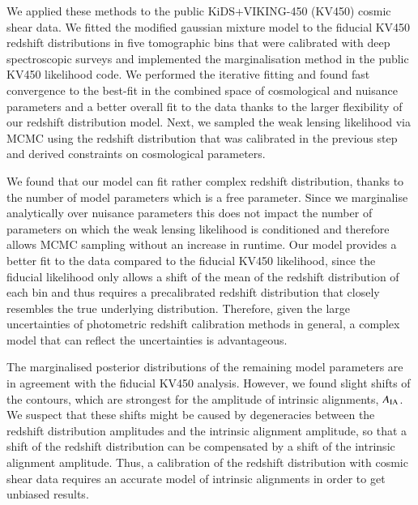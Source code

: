 \documentclass{aa}
\begin{document}
We applied these methods to the public KiDS+VIKING-450 (KV450) cosmic shear data. We fitted the modified gaussian mixture model to the fiducial KV450 redshift distributions in five tomographic bins that were calibrated with deep spectroscopic surveys and implemented the marginalisation method in the public KV450 likelihood code. We performed the iterative fitting and found fast convergence to the best-fit in the combined space of cosmological and nuisance parameters and a better overall fit to the data thanks to the larger flexibility of our redshift distribution model. Next, we sampled the weak lensing likelihood via MCMC using the redshift distribution that was calibrated in the previous step and derived constraints on cosmological parameters.

We found that our model can fit rather complex redshift distribution, thanks to the number of model parameters which is a free parameter. Since we marginalise analytically over nuisance parameters this does not impact the number of parameters on which the weak lensing likelihood is conditioned and therefore allows MCMC sampling without an increase in runtime. Our model provides a better fit to the data compared to the fiducial KV450 likelihood, since the fiducial likelihood only allows a shift of the mean of the redshift distribution of each bin and thus requires a precalibrated redshift distribution that closely resembles the true underlying distribution. Therefore, given the large uncertainties of photometric redshift calibration methods in general, a complex model that can reflect the uncertainties is advantageous. 

The marginalised posterior distributions of the remaining model parameters are in agreement with the fiducial KV450 analysis. However, we found slight shifts of the contours, which are strongest for the amplitude of intrinsic alignments, $A_{\rm IA}$. We suspect that these shifts might be caused by degeneracies between the redshift distribution amplitudes and the intrinsic alignment amplitude, so that a shift of the redshift distribution can be compensated by a shift of the intrinsic alignment amplitude. Thus, a calibration of the redshift distribution with cosmic shear data requires an accurate model of intrinsic alignments in order to get unbiased results.
  
\begin{acknowledgements}
  
\end{acknowledgements}




\end{document}
